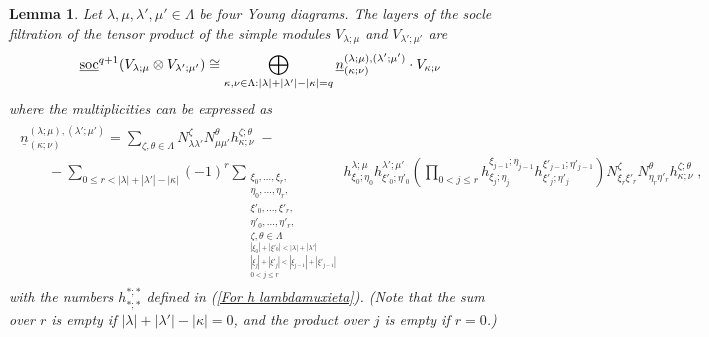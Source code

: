 \documentclass[12pt]{article}
\def\ul  {\underline}
\newtheorem{lemma}[theorem]{Lemma}
\begin{document}
\begin{lemma}\label{Lemma tens prod small simple}
Let $\lambda,\mu,\lambda',\mu'\in\Lambda$ be four Young diagrams. The layers of the socle filtration of the tensor product of the simple modules $V_{\lambda;\mu}$ and $V_{\lambda';\mu'}$ are
$$
\ul{\rm soc}^{q+1}(V_{\lambda;\mu} \otimes V_{\lambda';\mu'}) \cong \bigoplus\limits_{\kappa,\nu\in\Lambda:|\lambda|+|\lambda'|-|\kappa|=q} \ul{n}^{(\lambda;\mu),(\lambda';\mu')}_{(\kappa;\nu)} \cdot V_{\kappa;\nu}
$$
where the multiplicities can be expressed as
\begin{gather*}
\begin{array}{l}
\ul{n}^{(\lambda;\mu),(\lambda';\mu')}_{(\kappa;\nu)}=  \sum\limits_{\zeta,\theta\in\Lambda} N^{\zeta}_{\lambda\lambda'}N^{\theta}_{\mu\mu'} h^{\zeta;\theta}_{\kappa;\nu} \; - \\ \qquad - \sum\limits_{0\leq r<|\lambda|+|\lambda'|-|\kappa|} (-1)^r \sum\limits_{\begin{matrix}\xi_0,...,\xi_r,\\ \eta_0,...,\eta_r, \\ \xi'_0,...,\xi'_r,\\ \eta'_0,...,\eta'_r, \\ \zeta,\theta\in\Lambda \\ {_{|\xi_0|+|\xi'_0|<|\lambda|+|\lambda'|}} \\ {_{|\xi_j|+|\xi'_j|<|\xi_{j-1}|+|\xi'_{j-1}|}}\\ {_{0<j\leq r}} \end{matrix} } h^{\lambda;\mu}_{\xi_0;\eta_0} h^{\lambda';\mu'}_{\xi'_0;\eta'_0}(\prod\limits_{0<j\leq r} h^{\xi_{j-1};\eta_{j-1}}_{\xi_{j};\eta_{j}} h^{\xi'_{j-1};\eta'_{j-1}}_{\xi'_{j};\eta'_{j}})  N^{\zeta}_{\xi_r\xi'_r} N^{\theta}_{\eta_r\eta'_r} h^{\zeta;\theta}_{\kappa;\nu} \;,
\end{array}
\end{gather*}
with the numbers $h^{*;*}_{*;*}$ defined in (\ref{For h lambdamuxieta}). (Note that the sum over $r$ is empty if $|\lambda|+|\lambda'|-|\kappa|=0$, and the product over $j$ is empty if $r=0$.)
\end{lemma}
\end{document}

